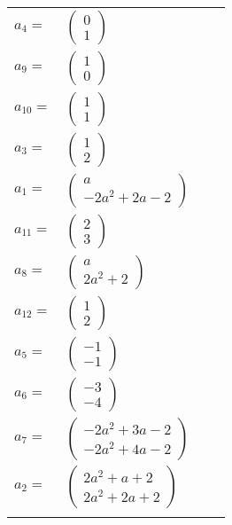 \documentclass[1p]{elsarticle_modified}
\theoremstyle{definition}
\begin{document}
\begin{tabular}{m{7pt} m{180pt} m{7pt} m{180pt} }
\flushright $a_{4}=$&$\begin{pmatrix}0\\1\end{pmatrix}$ \\
\flushright $a_{9}=$&$\begin{pmatrix}1\\0\end{pmatrix}$ \\
\flushright $a_{10}=$&$\begin{pmatrix}1\\1\end{pmatrix}$ \\
\flushright $a_{3}=$&$\begin{pmatrix}1\\2\end{pmatrix}$ \\
\flushright $a_{1}=$&$\begin{pmatrix}a\\-2 a^2+2 a-2\end{pmatrix}$ \\
\flushright $a_{11}=$&$\begin{pmatrix}2\\3\end{pmatrix}$ \\
\flushright $a_{8}=$&$\begin{pmatrix}a\\2 a^2+2\end{pmatrix}$ \\
\flushright $a_{12}=$&$\begin{pmatrix}1\\2\end{pmatrix}$ \\
\flushright $a_{5}=$&$\begin{pmatrix}-1\\-1\end{pmatrix}$ \\
\flushright $a_{6}=$&$\begin{pmatrix}-3\\-4\end{pmatrix}$ \\
\flushright $a_{7}=$&$\begin{pmatrix}-2 a^2+3 a-2\\-2 a^2+4 a-2\end{pmatrix}$ \\
\flushright $a_{2}=$&$\begin{pmatrix}2 a^2+a+2\\2 a^2+2 a+2\end{pmatrix}$\\&\end{tabular}
\end{document}

